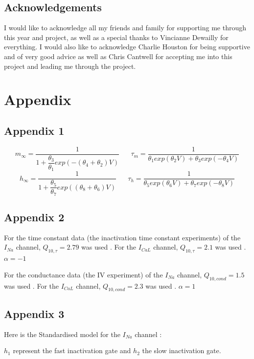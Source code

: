 \documentclass[11pt]{report}
\begin{document}
\section{Acknowledgements}

I would like to acknowledge all my friends and family for supporting me through this year and project, as well as a special thanks to Vincianne Dewailly for everything.
I would also like to acknowledge Charlie Houston for being supportive and of very good advice as well as Chris Cantwell for accepting me into this project and leading me through the project.

\printbibliography[title={References}]



\chapter{Appendix}
\section{Appendix 1}
$$m_{\infty} = \dfrac{1}{1 + \dfrac{\theta_{3}}{\theta_{1}}exp(-(\theta_{4} + \theta_{2})V) } \; \; \; \; \; \;  \tau_{m} = \dfrac{1}{\theta_{1}exp(\theta_{2}V)+\theta_{3}exp(-\theta_{4}V)} $$
$$ h_{\infty} = \dfrac{1}{1 + \dfrac{\theta_{5}}{\theta_{7}}exp((\theta_{8} + \theta_{6})V) }  \; \; \; \; \; \;  \tau_{h} = \dfrac{1}{\theta_{5}exp(\theta_{6}V)+\theta_{7}exp(-\theta_{8}V)}$$

\section{Appendix 2}
For the time constant data (the inactivation time constant experiments) of the $I_{Na}$ channel, $Q_{10,\tau} = 2.79$ was used \cite{tenTusscher2004}. For the $I_{CaL}$ channel, $Q_{10,\tau} = 2.1$ was used \cite{tenTusscher2004}. $\alpha = -1$

For the conductance data (the IV experiment) of the $I_{Na}$ channel, $Q_{10,cond} = 1.5$ was used \cite{Correa1991}. For the $I_{CaL}$ channel, $Q_{10,cond} = 2.3$ was used \cite{Kiyosue1993}. $\alpha = 1$

\section{Appendix 3}
Here is the Standardised model for the $I_{Na}$ channel :

$h_1$ represent the fast inactivation gate and $h_2$ the slow inactivation gate.
\end{document}
